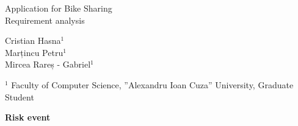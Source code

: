 \documentclass[a4paper]{article}
\begin{document}

\Large
 \begin{center}
Application for Bike Sharing\\ 
Requirement analysis

\hspace{10pt}

\large
Cristian Hasna$^1$ \\
Marțincu Petru$^1$ \\
Mircea Rareș - Gabriel$^1$ \\

\hspace{10pt}

\small  
$^1$ Faculty of Computer Science, ”Alexandru Ioan Cuza” University, Graduate Student\\ 

\end{center}

\hspace{10pt}

\textbf{Risk event} \ \\

\normalsize
\end{document}
